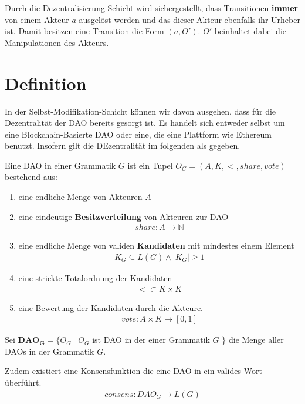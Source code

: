 \documentclass[a4paper,12pt]{report}
\begin{document}
Durch die Dezentralisierung-Schicht wird sichergestellt, dass Transitionen \textbf{immer} von einem Akteur $a$ ausgelöst werden und das dieser Akteur ebenfalls ihr Urheber ist. Damit besitzen eine Transition die Form $(a, O')$. $O'$ beinhaltet dabei die Manipulationen des Akteurs.


\section{Definition}
\label{smoddef}
In der Selbst-Modifikation-Schicht können wir davon ausgehen, dass für die Dezentralität der DAO bereits gesorgt ist. Es handelt sich entweder selbst um eine Blockchain-Basierte DAO oder eine, die eine Plattform wie Ethereum benutzt. Insofern gilt die DEzentralität im folgenden als gegeben.

Eine DAO in einer Grammatik $G$ ist ein Tupel $O_G=(A, K, <, share, vote)$ bestehend aus:

\begin{enumerate}
\item eine endliche Menge von Akteuren $A$
\item eine eindeutige \textbf{Besitzverteilung} von Akteuren zur DAO
\begin{eqnarray}
  share: A \rightarrow \mathbb{N}
\end{eqnarray}
\item eine endliche Menge von validen \textbf{Kandidaten} mit mindestes einem Element 
\begin{eqnarray}
  K_G \subseteq L(G) \land |K_G| \geq 1
\end{eqnarray}
\item eine strickte Totalordnung der Kandidaten 
\begin{eqnarray}
   < \subset K\times K 
\end{eqnarray}
\item eine Bewertung der Kandidaten durch die Akteure. 
\begin{eqnarray}
  vote: A\times K \rightarrow [0,1]
\end{eqnarray}
\end{enumerate}

Sei $\mathbf{DAO_G} = \{ O_G\ |$ $O_G$ ist DAO in der einer Grammatik $G$ $\}$ die Menge aller DAOs in der Grammatik $G$.

Zudem existiert eine Konsensfunktion die eine DAO in ein valides Wort überführt. 
\begin{eqnarray}
  consens: DAO_G \rightarrow L(G)
\end{eqnarray}
\end{document}
